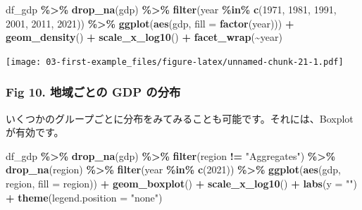 \documentclass[
  xelatex, ja=standard]{bxjsbook}
\newenvironment{Shaded}{\begin{snugshade}}{\end{snugshade}}
\newcommand{\AttributeTok}[1]{\textcolor[rgb]{0.13,0.29,0.53}{#1}}
\newcommand{\DecValTok}[1]{\textcolor[rgb]{0.00,0.00,0.81}{#1}}
\newcommand{\FunctionTok}[1]{\textcolor[rgb]{0.13,0.29,0.53}{\textbf{#1}}}
\newcommand{\NormalTok}[1]{#1}
\newcommand{\SpecialCharTok}[1]{\textcolor[rgb]{0.81,0.36,0.00}{\textbf{#1}}}
\newcommand{\StringTok}[1]{\textcolor[rgb]{0.31,0.60,0.02}{#1}}
\theoremstyle{definition}
\theoremstyle{definition}
\theoremstyle{definition}
\theoremstyle{definition}
\theoremstyle{remark}
\begin{document}
\begin{Shaded}
\begin{Highlighting}[]
\NormalTok{df\_gdp }\SpecialCharTok{\%\textgreater{}\%} \FunctionTok{drop\_na}\NormalTok{(gdp) }\SpecialCharTok{\%\textgreater{}\%} 
  \FunctionTok{filter}\NormalTok{(year }\SpecialCharTok{\%in\%} \FunctionTok{c}\NormalTok{(}\DecValTok{1971}\NormalTok{, }\DecValTok{1981}\NormalTok{, }\DecValTok{1991}\NormalTok{, }\DecValTok{2001}\NormalTok{, }\DecValTok{2011}\NormalTok{, }\DecValTok{2021}\NormalTok{)) }\SpecialCharTok{\%\textgreater{}\%}
  \FunctionTok{ggplot}\NormalTok{(}\FunctionTok{aes}\NormalTok{(gdp, }\AttributeTok{fill =} \FunctionTok{factor}\NormalTok{(year))) }\SpecialCharTok{+} 
  \FunctionTok{geom\_density}\NormalTok{() }\SpecialCharTok{+} \FunctionTok{scale\_x\_log10}\NormalTok{() }\SpecialCharTok{+} \FunctionTok{facet\_wrap}\NormalTok{(}\SpecialCharTok{\textasciitilde{}}\NormalTok{year)}
\end{Highlighting}
\end{Shaded}

\texttt{[image: 03-first-example\_files/figure-latex/unnamed-chunk-21-1.pdf]}

\hypertarget{fig-10.-ux5730ux57dfux3054ux3068ux306e-gdp-ux306eux5206ux5e03}{%
\subsubsection{Fig 10. 地域ごとの GDP の分布}\label{fig-10.-ux5730ux57dfux3054ux3068ux306e-gdp-ux306eux5206ux5e03}}

いくつかのグループごとに分布をみてみることも可能です。それには、Boxplot が有効です。

\begin{Shaded}
\begin{Highlighting}[]
\NormalTok{df\_gdp }\SpecialCharTok{\%\textgreater{}\%} \FunctionTok{drop\_na}\NormalTok{(gdp) }\SpecialCharTok{\%\textgreater{}\%} \FunctionTok{filter}\NormalTok{(region }\SpecialCharTok{!=} \StringTok{"Aggregates"}\NormalTok{) }\SpecialCharTok{\%\textgreater{}\%}
  \FunctionTok{drop\_na}\NormalTok{(region) }\SpecialCharTok{\%\textgreater{}\%} \FunctionTok{filter}\NormalTok{(year }\SpecialCharTok{\%in\%} \FunctionTok{c}\NormalTok{(}\DecValTok{2021}\NormalTok{)) }\SpecialCharTok{\%\textgreater{}\%}
  \FunctionTok{ggplot}\NormalTok{(}\FunctionTok{aes}\NormalTok{(gdp, region, }\AttributeTok{fill =}\NormalTok{ region)) }\SpecialCharTok{+} 
  \FunctionTok{geom\_boxplot}\NormalTok{() }\SpecialCharTok{+} \FunctionTok{scale\_x\_log10}\NormalTok{() }\SpecialCharTok{+} \FunctionTok{labs}\NormalTok{(}\AttributeTok{y =} \StringTok{""}\NormalTok{) }\SpecialCharTok{+} 
  \FunctionTok{theme}\NormalTok{(}\AttributeTok{legend.position =} \StringTok{"none"}\NormalTok{)}
\end{Highlighting}
\end{Shaded}
\end{document}
